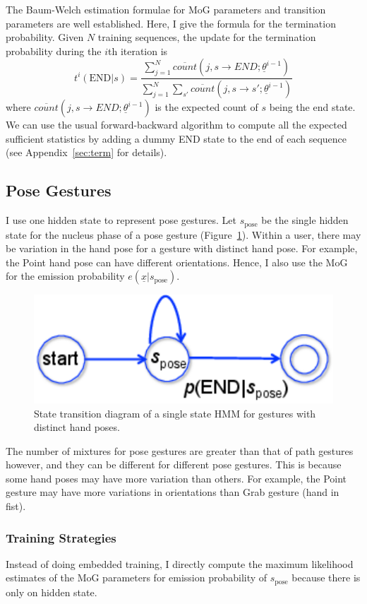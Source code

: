 The Baum-Welch estimation formulae for MoG parameters and transition parameters
are well established. Here, I give the formula for the termination probability.
Given $N$ training sequences, the update for the termination probability during the $i$th iteration is 
\begin{displaymath}
t^i(\text{END}|s) = \frac{\sum_{j = 1}^N \overline{count}(j, s\rightarrow
END;\underline{\theta}^{i-1})} {\sum_{j = 1}^N\sum_{s'} \overline{count}(j, s\rightarrow s';\underline{\theta}^{i-1})}
\end{displaymath}
where $\overline{count}(j, s\rightarrow END;\underline{\theta}^{i-1})$ is the expected count of 
$s$ being the end state. We can use the usual forward-backward algorithm to compute all the 
expected sufficient statistics by adding a dummy END state to the end of each
sequence (see Appendix~\ref{sec:term} for details).

\subsection{Pose Gestures}
I use one hidden state to represent pose gestures. Let
$s_{\text{pose}}$ be the single hidden state for the nucleus phase of a
pose gesture (Figure~\ref{fig:single}). Within a user,
there may be variation in the hand pose for a gesture with distinct hand pose.
For example, the Point hand pose can have different orientations.
Hence, I also use the MoG for the emission probability
$e(\underline{x} | s_\text{pose})$. 

\begin{figure}[tbh]
\centering
\includegraphics[width=0.5\columnwidth]{figures/single_state.pdf}
\caption{State transition diagram of a single state HMM for gestures with
distinct hand poses. }
\label{fig:single}
\end{figure}

The number of mixtures for pose gestures are greater than that of path
gestures however, and they can be different for different pose gestures. This is
because some hand poses may have more variation than others.
For example, the Point gesture may have more variations in orientations than
Grab gesture (hand in fist).

\subsubsection{Training Strategies}\label{sec:pose-gesture}
Instead of doing embedded
training, I directly compute the maximum likelihood estimates of the MoG
parameters for emission probability of $s_{\text{pose}}$ because there is only
on hidden state.

